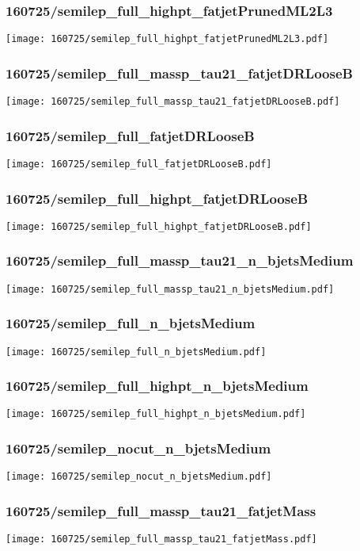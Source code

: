 \begin{frame}
   \frametitle{\small 160725/semilep\_full\_highpt\_fatjetPrunedML2L3}
   \centering
   \texttt{[image: 160725/semilep\_full\_highpt\_fatjetPrunedML2L3.pdf]}
\end{frame}

\begin{frame}
   \frametitle{\small 160725/semilep\_full\_massp\_tau21\_fatjetDRLooseB}
   \centering
   \texttt{[image: 160725/semilep\_full\_massp\_tau21\_fatjetDRLooseB.pdf]}
\end{frame}

\begin{frame}
   \frametitle{\small 160725/semilep\_full\_fatjetDRLooseB}
   \centering
   \texttt{[image: 160725/semilep\_full\_fatjetDRLooseB.pdf]}
\end{frame}

\begin{frame}
   \frametitle{\small 160725/semilep\_full\_highpt\_fatjetDRLooseB}
   \centering
   \texttt{[image: 160725/semilep\_full\_highpt\_fatjetDRLooseB.pdf]}
\end{frame}

\begin{frame}
   \frametitle{\small 160725/semilep\_full\_massp\_tau21\_n\_bjetsMedium}
   \centering
   \texttt{[image: 160725/semilep\_full\_massp\_tau21\_n\_bjetsMedium.pdf]}
\end{frame}

\begin{frame}
   \frametitle{\small 160725/semilep\_full\_n\_bjetsMedium}
   \centering
   \texttt{[image: 160725/semilep\_full\_n\_bjetsMedium.pdf]}
\end{frame}

\begin{frame}
   \frametitle{\small 160725/semilep\_full\_highpt\_n\_bjetsMedium}
   \centering
   \texttt{[image: 160725/semilep\_full\_highpt\_n\_bjetsMedium.pdf]}
\end{frame}

\begin{frame}
   \frametitle{\small 160725/semilep\_nocut\_n\_bjetsMedium}
   \centering
   \texttt{[image: 160725/semilep\_nocut\_n\_bjetsMedium.pdf]}
\end{frame}

\begin{frame}
   \frametitle{\small 160725/semilep\_full\_massp\_tau21\_fatjetMass}
   \centering
   \texttt{[image: 160725/semilep\_full\_massp\_tau21\_fatjetMass.pdf]}
\end{frame}

